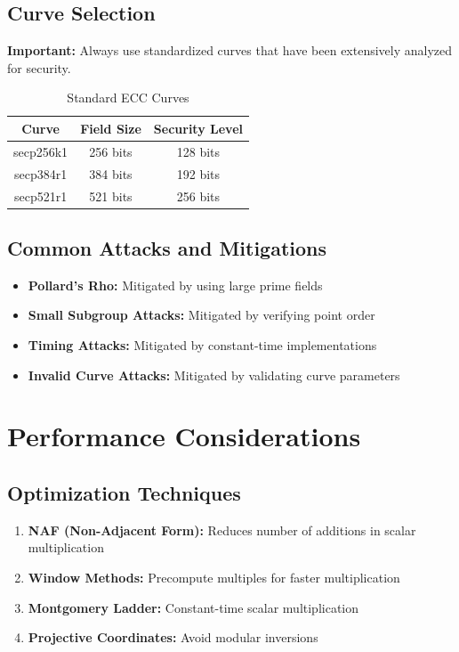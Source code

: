 \documentclass[11pt,a4paper]{article}
\begin{document}
\subsection{Curve Selection}

\begin{warningbox}
\textbf{Important:} Always use standardized curves that have been extensively analyzed for security.
\end{warningbox}

\begin{table}[h]
\centering
\begin{tabular}{|c|c|c|}
\hline
\textbf{Curve} & \textbf{Field Size} & \textbf{Security Level} \\
\hline
secp256k1 & 256 bits & 128 bits \\
secp384r1 & 384 bits & 192 bits \\
secp521r1 & 521 bits & 256 bits \\
\hline
\end{tabular}
\caption{Standard ECC Curves}
\end{table}

\subsection{Common Attacks and Mitigations}

\begin{itemize}
    \item \textbf{Pollard's Rho:} Mitigated by using large prime fields
    \item \textbf{Small Subgroup Attacks:} Mitigated by verifying point order
    \item \textbf{Timing Attacks:} Mitigated by constant-time implementations
    \item \textbf{Invalid Curve Attacks:} Mitigated by validating curve parameters
\end{itemize}

\section{Performance Considerations}

\subsection{Optimization Techniques}

\begin{enumerate}
    \item \textbf{NAF (Non-Adjacent Form):} Reduces number of additions in scalar multiplication
    \item \textbf{Window Methods:} Precompute multiples for faster multiplication
    \item \textbf{Montgomery Ladder:} Constant-time scalar multiplication
    \item \textbf{Projective Coordinates:} Avoid modular inversions
\end{enumerate}
\end{document}
